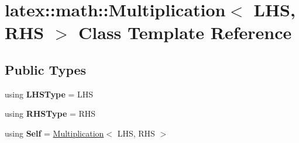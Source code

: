 \hypertarget{classlatex_1_1math_1_1Multiplication}{\section{latex\-:\-:math\-:\-:Multiplication$<$ L\-H\-S, R\-H\-S $>$ Class Template Reference}
\label{classlatex_1_1math_1_1Multiplication}
}
\subsection*{Public Types}
\begin{DoxyCompactItemize}
\item 
\hypertarget{classlatex_1_1math_1_1Multiplication_a78215162923b7966cae1e4a360560668}{using {\bfseries L\-H\-S\-Type} = L\-H\-S}\label{classlatex_1_1math_1_1Multiplication_a78215162923b7966cae1e4a360560668}

\item 
\hypertarget{classlatex_1_1math_1_1Multiplication_ad505c00cdcc46719478e3199854f2b0b}{using {\bfseries R\-H\-S\-Type} = R\-H\-S}\label{classlatex_1_1math_1_1Multiplication_ad505c00cdcc46719478e3199854f2b0b}

\item 
\hypertarget{classlatex_1_1math_1_1Multiplication_a6e50f629d0cd2719816ca3b6b80fefd0}{using {\bfseries Self} = \hyperlink{classlatex_1_1math_1_1Multiplication}{Multiplication}$<$ L\-H\-S, R\-H\-S $>$}\label{classlatex_1_1math_1_1Multiplication_a6e50f629d0cd2719816ca3b6b80fefd0}

\end{DoxyCompactItemize}
